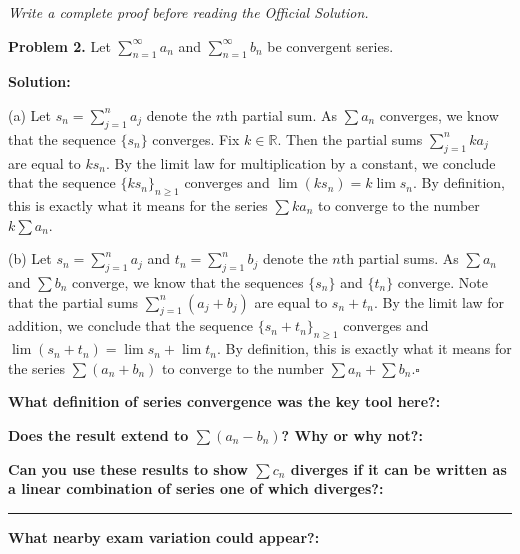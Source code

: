 \documentclass[12pt]{article}
\newcommand{\fillfield}[1]{%
  \par\noindent\textbf{#1:}\enspace\hrulefill\par\vspace{3pt}%
}
\newcommand{\fillfieldlong}[1]{%
  \par\noindent\textbf{#1:}\par\vspace{1.5cm}%
  \noindent\rule{\linewidth}{0.35pt}\par\vspace{4pt}%
}
\newcommand{\writespace}[1]{\vspace{#1}}
\begin{document}
\newpage

\begin{tcolorbox}[
  enhanced, breakable,
  colback  = pass5gray,
  colframe = black!38,
  fonttitle = \bfseries,
  title = {Pass 5 \enspace\textbf{--}\enspace Full Proof Attempt}
]
\small\itshape Write a complete proof before reading the Official Solution.\par
\normalfont\normalsize
\writespace{19cm}
\end{tcolorbox}

\newpage

\begin{tcolorbox}[
  enhanced, breakable,
  colback  = solgreen,
  colframe = green!45!black,
  fonttitle = \bfseries,
  title = {\textsc{Official Solution}\hfill Homework 6 -- Selected Solutions}
]
\textbf{Problem 2.}
Let $\sum_{n=1}^{\infty} a_n$ and $\sum_{n=1}^{\infty} b_n$ be convergent series.

\medskip\textbf{Solution:}

\medskip
(a) Let $s_n = \sum_{j=1}^{n} a_j$ denote the $n$th partial sum.
As $\sum a_n$ converges, we know that the sequence $\{s_n\}$ converges.
Fix $k \in \mathbb{R}$.
Then the partial sums $\sum_{j=1}^{n} ka_j$ are equal to $ks_n$.
By the limit law for multiplication by a constant, we conclude that the sequence
$\{ks_n\}_{n\geq 1}$ converges and $\lim(ks_n) = k\lim s_n$.
By definition, this is exactly what it means for the series $\sum ka_n$ to converge
to the number $k\sum a_n$.

\medskip
(b) Let $s_n = \sum_{j=1}^{n} a_j$ and $t_n = \sum_{j=1}^{n} b_j$ denote the $n$th
partial sums.
As $\sum a_n$ and $\sum b_n$ converge, we know that the sequences $\{s_n\}$ and
$\{t_n\}$ converge.
Note that the partial sums $\sum_{j=1}^{n}(a_j + b_j)$ are equal to $s_n + t_n$.
By the limit law for addition, we conclude that the sequence $\{s_n + t_n\}_{n \geq 1}$
converges and $\lim(s_n + t_n) = \lim s_n + \lim t_n$.
By definition, this is exactly what it means for the series $\sum(a_n + b_n)$ to
converge to the number $\sum a_n + \sum b_n$.\hfill$\square$
\end{tcolorbox}

\bigskip

\begin{tcolorbox}[
  enhanced, breakable,
  colback  = reflectcyan,
  colframe = cyan!55!black,
  fonttitle = \bfseries,
  title = {\textsc{Reflection \& Variation}}
]
\fillfield{What definition of series convergence was the key tool here?}
\fillfield{Does the result extend to $\sum(a_n - b_n)$? Why or why not?}
\fillfieldlong{Can you use these results to show $\sum c_n$ diverges if it can be written as a linear combination of series one of which diverges?}
\fillfield{What nearby exam variation could appear?}
\end{tcolorbox}
\end{document}
